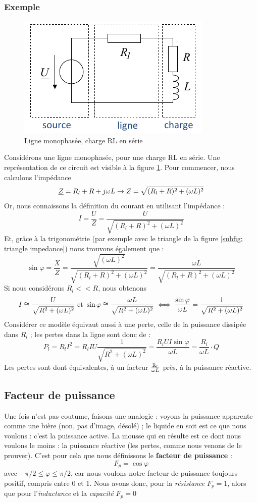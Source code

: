 \documentclass[12pt,a4paper]{article}
\newcommand{\uz}{\uline{Z} }
\begin{document}
\subsubsection{Exemple}
\begin{figure}[!h]
	\centering
	\includegraphics[scale=0.7]{images/ligne_monophasee}
	\caption{Ligne monophasée, charge RL en série}
	\label{fig: ligne monophasee}
\end{figure}
Considérons une ligne monophasée, pour une charge RL en série. Une représentation de ce circuit est visible à la figure \ref{fig: ligne monophasee}. Pour commencer, nous calculons l'impédance 
\[\uz = R_l + R + j\omega L \to Z = \sqrt{(R_l + R)^2 + (\omega L)^2}\]
Or, nous connaissons la définition du courant en utilisant l'impédance :
\[I = \frac{U}{Z} = \frac{U}{\sqrt{(R_l + R)^2 + (\omega L)^2}}\]
Et, grâce à la trigonométrie (par exemple avec le triangle de la figure \ref{subfig: triangle impedance}) nous trouvons également que :
\[\sin\varphi = \frac{X}{Z} = \frac{\sqrt{(\omega L)^2}}{\sqrt{(R_l + R)^2 + (\omega L)^2}} = \frac{\omega L}{\sqrt{(R_l + R)^2 + (\omega L)^2}}\]
Si nous considérons $R_l << R$, nous obtenons 
\[I \cong \frac{U}{\sqrt{R^2 + (\omega L)^2}} \mbox{ et } \sin\varphi \cong \frac{\omega L}{\sqrt{R^2 + (\omega L)^2}} \iff \frac{\sin\varphi}{\omega L} = \frac{1}{\sqrt{R^2 + (\omega L)^2}}\]
Considérer ce modèle équivaut aussi à une perte, celle de la puissance dissipée dans $R_l$ ; les pertes dans la ligne sont donc de :
\[P_l = R_lI^2 = R_l I U \frac{1}{\sqrt{R^2 + (\omega L)^2}} = \frac{R_l UI \sin\varphi}{\omega L} = \frac{R_l}{\omega L} \cdot Q\]
Les pertes sont dont équivalentes, à un facteur $\frac{\mathbb{R}_l}{\omega L}$ près, à la puissance réactive.
\subsection{Facteur de puissance}
Une fois n'est pas coutume, faisons une analogie : voyons la puissance apparente comme une bière (non, pas d'image, désolé) ; le liquide en soit est ce que nous voulons : c'est la puissance active. La mousse qui en résulte est ce dont nous voulons le moins : la puissance réactive (les pertes, comme nous venons de le prouver). C'est pour cela que nous définissons le \textbf{facteur de puissance} :
\begin{equation}
	F_p = \cos\varphi
\end{equation}
avec $-\pi/2 \leq \varphi \leq \pi/2$, car nous voulons notre facteur de puissance toujours positif, compris entre 0 et 1. Nous avons donc, pour la \textit{résistance} $F_p = 1$, alors que pour l'\textit{inductance} et la \textit{capacité} $F_p = 0$
\end{document}
